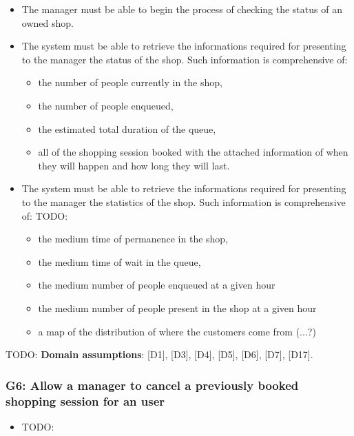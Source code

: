 \begin{itemize}[topsep=0pt]
    \item The manager must be able to begin the process of checking the status of an owned shop.
    \item The system must be able to retrieve the informations required for presenting to the manager the status of the shop.\newline
    Such information is comprehensive of:
    \begin{itemize}[topsep=0pt]
        \item the number of people currently in the shop,
        \item the number of people enqueued, 
        \item the estimated total duration of the queue,
        \item all of the shopping session booked with the attached information of when they will happen and how long they will last.
    \end{itemize}
    \item The system must be able to retrieve the informations required for presenting to the manager the statistics of the shop.\newline
    Such information is comprehensive of: TODO:
    \begin{itemize}[topsep=0pt]
        \item the medium time of permanence in the shop, 
        \item the medium time of wait in the queue,
        \item the medium number of people enqueued at a given hour
        \item the medium number of people present in the shop at a given hour
        \item a map of the distribution of where the customers come from (...?)
    \end{itemize}
\end{itemize}

TODO: \textbf{Domain assumptions}: [D1], [D3], [D4], [D5], [D6], [D7], [D17].

\subsubsection{G6: Allow a manager to cancel a previously booked shopping session for an user}
\label{subsubsect:G6}

\begin{itemize}[topsep=0pt]
    \item TODO:
\end{itemize}

